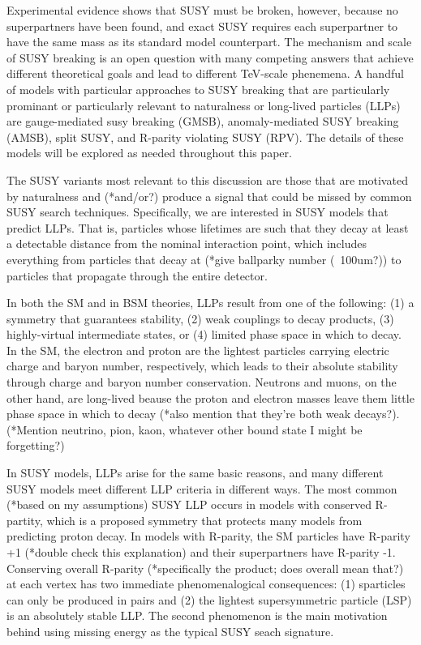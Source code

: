 \documentclass[12pt]{article}
\begin{document}
    Experimental evidence shows that SUSY must be broken, however, because no superpartners have been found, and exact SUSY requires each superpartner to have the same mass as its standard model counterpart. The mechanism and scale of SUSY breaking is an open question with many competing answers that achieve different theoretical goals and lead to different TeV-scale phenemena. A handful of models with particular approaches to SUSY breaking that are particularly prominant or particularly relevant to naturalness or long-lived particles (LLPs) are gauge-mediated susy breaking (GMSB), anomaly-mediated SUSY breaking (AMSB), split SUSY, and R-parity violating SUSY (RPV). The details of these models will be explored as needed throughout this paper.

    The SUSY variants most relevant to this discussion are those that are motivated by naturalness and (*and/or?) produce a signal that could be missed by common SUSY search techniques. Specifically, we are interested in SUSY models that predict LLPs. That is, particles whose lifetimes are such that they decay at least a detectable distance from the nominal interaction point, which includes everything from particles that decay at (*give ballparky number (~100um?)) to particles that propagate through the entire detector. 

    In both the SM and in BSM theories, LLPs result from one of the following: (1) a symmetry that guarantees stability, (2) weak couplings to decay products, (3) highly-virtual intermediate states, or (4) limited phase space in which to decay. In the SM, the electron and proton are the lightest particles carrying electric charge and baryon number, respectively, which leads to their absolute stability through charge and baryon number conservation. Neutrons and muons, on the other hand, are long-lived beause the proton and electron masses leave them little phase space in which to decay (*also mention that they're both weak decays?). (*Mention neutrino, pion, kaon, whatever other bound state I might be forgetting?)

    In SUSY models, LLPs arise for the same basic reasons, and many different SUSY models meet different LLP criteria in different ways. The most common (*based on my assumptions) SUSY LLP occurs in models with conserved R-partity, which is a proposed symmetry that protects many models from predicting proton decay. In models with R-parity, the SM particles have R-parity +1 (*double check this explanation) and their superpartners have R-parity -1. Conserving overall R-parity (*specifically the product; does overall mean that?) at each vertex has two immediate phenomenalogical consequences: (1) sparticles can only be produced in pairs and (2) the lightest supersymmetric particle (LSP) is an absolutely stable LLP. The second phenomenon is the main motivation behind using missing energy as the typical SUSY seach signature.
\end{document}
